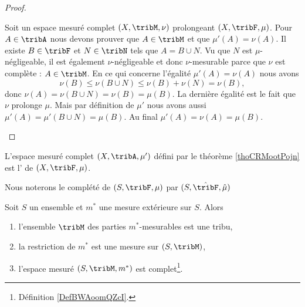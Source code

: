 \begin{proof}
\begin{subproof}
            Soit un espace mesuré complet \( (X,\tribM,\nu)\) prolongeant \( (X,\tribF,\mu)\). Pour \( A\in\tribA\) nous devons prouver que \( A\in\tribM\) et que \( \mu'(A)=\nu(A)\). Il existe \( B\in\tribF\) et \( N\in\tribN\) tels que \( A=B\cup N\). Vu que \( N\) est \( \mu\)-négligeable, il est également \( \nu\)-négligeable et donc \( \nu\)-mesurable parce que \(\nu\) est complète : \( A\in\tribM\). En ce qui concerne l'égalité \( \mu'(A)=\nu(A)\) nous avons
            \begin{equation}
                \nu(B)\leq\nu(B\cup N)\leq \nu(B)+\nu(N)=\nu(B),
            \end{equation}
            donc \( \nu(A)=\nu(B\cup N)=\nu(B)=\mu(B)\). La dernière égalité est le fait que \( \nu\) prolonge \( \mu\). Mais par définition de \( \mu'\) nous avons aussi \( \mu'(A)=\mu'(B\cup N)=\mu(B)\). Au final \( \mu'(A)=\nu(A)=\mu(B)\).
    \end{subproof}
\end{proof}

\begin{definition}
    L'espace mesuré complet \( (X,\tribA,\mu')\) défini par le théorème \ref{thoCRMootPojn} est l' de \( (X,\tribF,\mu)\).

    Nous noterons le complété de \( (S,\tribF,\mu)\) par \( (S,\hat\tribF,\hat \mu)\)
\end{definition}

\begin{theorem} \label{ThoUUIooaNljH}
    Soit \( S\) un ensemble et \( m^*\) une mesure extérieure sur \( S\). Alors
    \begin{enumerate}
        \item   \label{RPPooHSWWsi}
            l'ensemble \( \tribM\) des parties \( m^*\)-mesurables est une tribu,
        \item
            la restriction de \( m^*\) est une mesure sur \( (S,\tribM)\),
        \item
            l'espace mesuré \( (S,\tribM,m^*)\) est complet\footnote{Définition \ref{DefBWAoomQZcI}.}.
    \end{enumerate}
\end{theorem}

